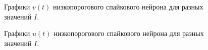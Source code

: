 \begin{figure}[h]
	\caption{Графики $v(t)$ низкопорогового спайкового нейрона для разных значений $I$.}
	\label{lts_different_I_potentials}
\end{figure}

\begin{figure}[h]
	\caption{Графики $u(t)$ низкопорогового спайкового нейрона для разных значений $I$.}
	\label{lts_different_I_recovery}
\end{figure}

